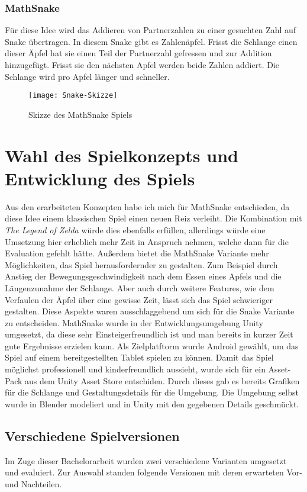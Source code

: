 \subsubsection{MathSnake}
Für diese Idee wird das Addieren von Partnerzahlen zu einer gesuchten Zahl auf Snake übertragen. In diesem Snake gibt es Zahlenäpfel. Frisst die Schlange einen dieser Äpfel hat sie einen Teil der Partnerzahl gefressen und zur Addition hinzugefügt. Frisst sie den nächsten Apfel werden beide Zahlen addiert. Die Schlange wird pro Apfel länger und schneller.
\begin{figure}[htb]
	\centering
	\texttt{[image: Snake-Skizze]}
	\caption{Skizze des MathSnake Spiels\label{fig:mathsnake}}
\end{figure}
\section{Wahl des Spielkonzepts und Entwicklung des Spiels}
Aus den erarbeiteten Konzepten habe ich mich für MathSnake entschieden, da diese Idee einem klassischen Spiel einen neuen Reiz verleiht. Die Kombination mit \textit{The Legend of Zelda} würde dies ebenfalls erfüllen, allerdings würde eine Umsetzung hier erheblich mehr Zeit in Anspruch nehmen, welche dann für die Evaluation gefehlt hätte. Außerdem bietet die MathSnake Variante mehr Möglichkeiten, das Spiel herausfordernder zu gestalten. Zum Beispiel durch Anstieg der Bewegungsgeschwindigkeit nach dem Essen eines Apfels und die Längenzunahme der Schlange. Aber auch durch weitere Features, wie dem Verfaulen der Äpfel über eine gewisse Zeit, lässt sich das Spiel schwieriger gestalten. Diese Aspekte waren ausschlaggebend um sich für die Snake Variante zu entscheiden.
MathSnake wurde in der Entwicklungsumgebung Unity umgesetzt, da diese sehr Einsteigerfreundlich ist und man bereits in kurzer Zeit gute Ergebnisse erzielen kann. Als Zielplatftorm wurde Android gewählt, um das Spiel auf einem bereitgestellten Tablet spielen zu können. Damit das Spiel möglichst professionell und kinderfreundlich aussieht, wurde sich für ein Asset-Pack aus dem Unity Asset Store entschiden. Durch dieses gab es bereits Grafiken für die Schlange und Gestaltungsdetails für die Umgebung. Die Umgebung selbst wurde in Blender modeliert und in Unity mit den gegebenen Details geschmückt.
\subsection{Verschiedene Spielversionen}
Im Zuge dieser Bachelorarbeit wurden zwei verschiedene Varianten umgesetzt und evaluiert. Zur Auswahl standen folgende Versionen mit deren erwarteten Vor- und Nachteilen.

